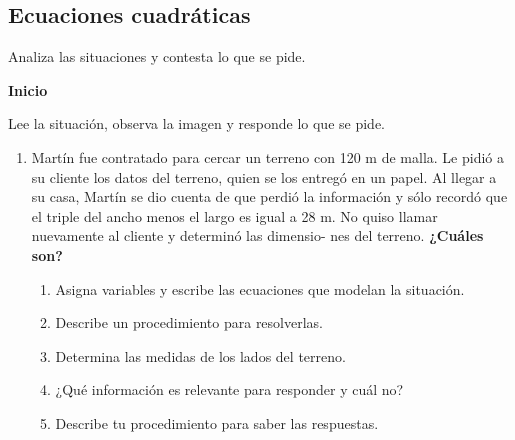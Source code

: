 \documentclass[11pt]{book}
\begin{document}
\subsection{Ecuaciones cuadráticas}

Analiza las situaciones y contesta lo que se pide.\\

\begin{boxK}
  \begin{center}\textbf{Inicio}\end{center}
  Lee la situación, observa la imagen y responde lo que se pide.
  \begin{enumerate}
    \item Martín fue contratado para cercar un terreno con 120 m de malla. Le pidió a su cliente
          los datos del terreno, quien se los entregó en un papel. Al llegar a su casa, Martín se dio
          cuenta de que perdió la información y sólo recordó que el triple del ancho menos el
          largo es igual a 28 m. No quiso llamar nuevamente al cliente y determinó las dimensio-
          nes del terreno. \textbf{¿Cuáles son?}
          \begin{enumerate}
            \item Asigna variables y escribe las ecuaciones que modelan la situación.
            \item Describe un procedimiento para resolverlas.
            \item Determina las medidas de los lados del terreno.
            \item ¿Qué información es relevante para responder y
                  cuál no?
            \item Describe tu procedimiento para saber las respuestas.
          \end{enumerate}
  \end{enumerate}

\end{boxK}
\end{document}
